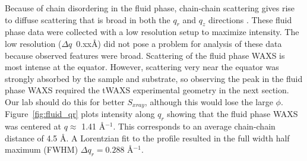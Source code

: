 Because of chain disordering in the fluid phase, chain-chain scattering
gives rise to diffuse scattering that is broad in both the $q_r$ and $q_z$ directions \cite{ref:Mills08}. 
These fluid phase data were collected with a low resolution setup to maximize
intensity. The low resolution (${\Delta}q$~0.xx\AA) did not pose a problem for analysis of these 
data because observed features were broad.  Scattering of the fluid phase WAXS
is most intense at the equator. However, scattering very near the equator
was strongly absorbed by the sample and substrate, so observing the 
peak in the fluid phase WAXS required the tWAXS experimental 
geometry in the next section.  
{\jn Our lab should do this for better $S_{xray}$, 
although this would lose the large $\phi$.}
Figure~\ref{fig:fluid_qr} plots intensity along $q_r$ showing that
the fluid phase WAXS was centered at $q \approx$ 1.41 \AA$^{-1}$. 
This corresponds to an average chain-chain distance of 4.5 \AA. 
A Lorentzian fit to the profile resulted in the full width half maximum
(FWHM) $\Delta q_r=0.288$ \AA$^{-1}$.

